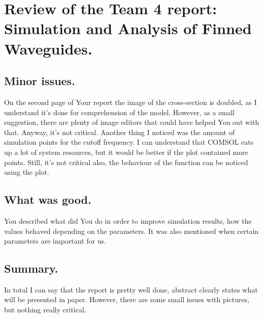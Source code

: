 \documentclass[a4paper, titlepage, 10pt]{article}
\begin{document}
\section{Review of the Team 4 report: \\ Simulation and Analysis of Finned Waveguides.}
\subsection{Minor issues.}
On the second page of Your report the image of the cross-section is doubled, as I understand it's done for comprehension of the model. However, as a small suggestion, there are plenty of image editors that could have helped You out with that. Anyway, it's not critical. Another thing I noticed was the amount of simulation points for the cutoff frequency. I can understand that COMSOL eats up a lot of system resources, but it would be better if the plot contained more points. Still, it's not critical also, the behaviour of the function can be noticed using the plot.
\subsection{What was good.}
You described what did You do in order to improve simulation results, how the values behaved depending on the parameters. It was also mentioned when certain parameters are important for us.
\subsection{Summary.}
In total I can say that the report is pretty well done, abstract clearly states what will be presented in paper. However, there are some small issues with pictures, but nothing really critical.
\end{document}

